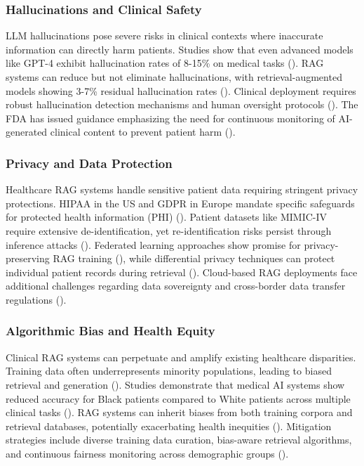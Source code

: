 \subsubsection{Hallucinations and Clinical Safety}
LLM hallucinations pose severe risks in clinical contexts where inaccurate information can directly harm patients. Studies show that even advanced models like GPT-4 exhibit hallucination rates of 8-15\% on medical tasks (\citep{alkaissi2023artificial}). RAG systems can reduce but not eliminate hallucinations, with retrieval-augmented models showing 3-7\% residual hallucination rates (\citep{shuster2021retrieval}). Clinical deployment requires robust hallucination detection mechanisms and human oversight protocols (\citep{ji2023survey}). The FDA has issued guidance emphasizing the need for continuous monitoring of AI-generated clinical content to prevent patient harm (\citep{fda2023ai}).

\subsubsection{Privacy and Data Protection}
Healthcare RAG systems handle sensitive patient data requiring stringent privacy protections. HIPAA in the US and GDPR in Europe mandate specific safeguards for protected health information (PHI) (\citep{hipaa2023privacy}). Patient datasets like MIMIC-IV require extensive de-identification, yet re-identification risks persist through inference attacks (\citep{rocher2019estimating}). Federated learning approaches show promise for privacy-preserving RAG training (\citep{li2023federated}), while differential privacy techniques can protect individual patient records during retrieval (\citep{dwork2014differential}). Cloud-based RAG deployments face additional challenges regarding data sovereignty and cross-border data transfer regulations (\citep{gdpr2018regulation}).

\subsubsection{Algorithmic Bias and Health Equity}
Clinical RAG systems can perpetuate and amplify existing healthcare disparities. Training data often underrepresents minority populations, leading to biased retrieval and generation (\citep{rajkomar2018ensuring}). Studies demonstrate that medical AI systems show reduced accuracy for Black patients compared to White patients across multiple clinical tasks (\citep{obermeyer2019dissecting}). RAG systems can inherit biases from both training corpora and retrieval databases, potentially exacerbating health inequities (\citep{chen2023health}). Mitigation strategies include diverse training data curation, bias-aware retrieval algorithms, and continuous fairness monitoring across demographic groups (\citep{mehrabi2021survey}).

